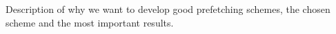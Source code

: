 Description of why we want to develop good prefetching schemes, the chosen scheme and the most important results.
